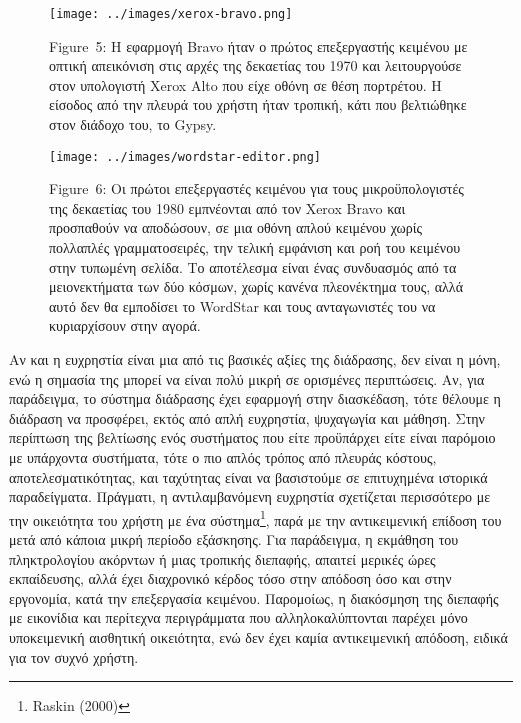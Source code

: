\documentclass[
]{article}
\begin{document}
\leavevmode{}%
\begin{figure}
\hypertarget{fig:xerox-bravo}{%
\centering
\texttt{[image: ../images/xerox-bravo.png]}
\caption{Figure~5: Η εφαρμογή Bravo ήταν ο πρώτος επεξεργαστής κειμένου
με οπτική απεικόνιση στις αρχές της δεκαετίας του 1970 και λειτουργούσε
στον υπολογιστή Xerox Alto που είχε οθόνη σε θέση πορτρέτου. Η είσοδος
από την πλευρά του χρήστη ήταν τροπική, κάτι που βελτιώθηκε στον διάδοχο
του, το Gypsy.}\label{fig:xerox-bravo}
}
\end{figure}

\leavevmode{}%
\begin{figure}
\hypertarget{fig:wordstar-editor}{%
\centering
\texttt{[image: ../images/wordstar-editor.png]}
\caption{Figure~6: Οι πρώτοι επεξεργαστές κειμένου για τους
μικροϋπολογιστές της δεκαετίας του 1980 εμπνέονται από τον Xerox Bravo
και προσπαθούν να αποδώσουν, σε μια οθόνη απλού κειμένου χωρίς πολλαπλές
γραμματοσειρές, την τελική εμφάνιση και ροή του κειμένου στην τυπωμένη
σελίδα. Το αποτέλεσμα είναι ένας συνδυασμός από τα μειονεκτήματα των δύο
κόσμων, χωρίς κανένα πλεονέκτημα τους, αλλά αυτό δεν θα εμποδίσει το
WordStar και τους ανταγωνιστές του να κυριαρχίσουν στην
αγορά.}\label{fig:wordstar-editor}
}
\end{figure}

Αν και η ευχρηστία είναι μια από τις βασικές αξίες της διάδρασης, δεν
είναι η μόνη, ενώ η σημασία της μπορεί να είναι πολύ μικρή σε ορισμένες
περιπτώσεις. Αν, για παράδειγμα, το σύστημα διάδρασης έχει εφαρμογή στην
διασκέδαση, τότε θέλουμε η διάδραση να προσφέρει, εκτός από απλή
ευχρηστία, ψυχαγωγία και μάθηση. Στην περίπτωση της βελτίωσης ενός
συστήματος που είτε προϋπάρχει είτε είναι παρόμοιο με υπάρχοντα
συστήματα, τότε ο πιο απλός τρόπος από πλευράς κόστους,
αποτελεσματικότητας, και ταχύτητας είναι να βασιστούμε σε επιτυχημένα
ιστορικά παραδείγματα. Πράγματι, η αντιλαμβανόμενη ευχρηστία σχετίζεται
περισσότερο με την οικειότητα του χρήστη με ένα σύστημα\footnote{Raskin
  (2000)}, παρά με την αντικειμενική επίδοση του μετά από κάποια μικρή
περίοδο εξάσκησης. Για παράδειγμα, η εκμάθηση του πληκτρολογίου ακόρντων
ή μιας τροπικής διεπαφής, απαιτεί μερικές ώρες εκπαίδευσης, αλλά έχει
διαχρονικό κέρδος τόσο στην απόδοση όσο και στην εργονομία, κατά την
επεξεργασία κειμένου. Παρομοίως, η διακόσμηση της διεπαφής με εικονίδια
και περίτεχνα περιγράμματα που αλληλοκαλύπτονται παρέχει μόνο
υποκειμενική αισθητική οικειότητα, ενώ δεν έχει καμία αντικειμενική
απόδοση, ειδικά για τον συχνό χρήστη.
\end{document}
